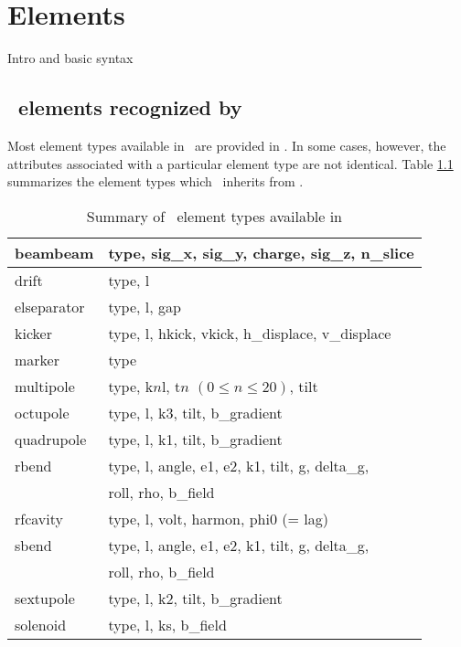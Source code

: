 \chapter{Elements}

Intro and basic syntax

\section{\mad\ elements recognized by \bmad}
Most element types available in \mad\ are provided in \bmad.  In some cases, however, the attributes
associated with a particular element type are not identical.  Table \ref{tab:mad_elements} summarizes the
element types which \bmad\ inherits from \mad.

\begin{table}\label{tab:mad_elements}\center
{\tt\begin{tabular}{|l|l|} \hline
     beambeam      &  type, sig\_x, sig\_y, charge, sig\_z, n\_slice \\ \hline
     drift         &  type, l \\ \hline
     elseparator   &  type, l, gap \\ \hline
     kicker        &  type, l, hkick, vkick, h\_displace, v\_displace \\ \hline
     marker        &  type \\ \hline
     multipole     &  type, k$n$l, t$n$ $(0 \le n \le 20)$, tilt \\ \hline
     octupole      &  type, l, k3, tilt, b\_gradient \\ \hline
     quadrupole    &  type, l, k1, tilt, b\_gradient \\ \hline
     rbend         &  type, l, angle, e1, e2, k1, tilt, g, delta\_g, \\
                   &  roll, rho, b\_field \\ \hline
     rfcavity      &  type, l, volt, harmon, phi0 (= lag)  \\ \hline
     sbend         &  type, l, angle, e1, e2, k1, tilt, g, delta\_g, \\
                   &  roll, rho, b\_field \\ \hline
     sextupole     &  type, l, k2, tilt, b\_gradient \\ \hline
     solenoid      &  type, l, ks, b\_field \\ \hline 
\end{tabular}}
\caption{Summary of \mad\ element types available in \bmad}
\end{table}

